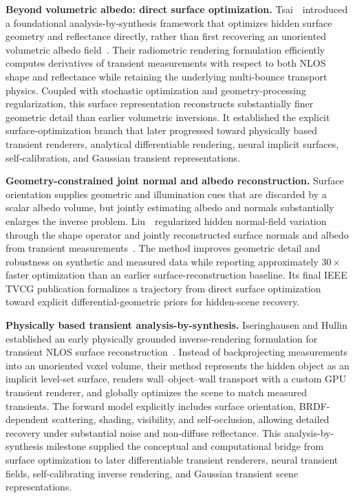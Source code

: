\vspace{0.8mm}
\noindent \textbf{Beyond volumetric albedo: direct surface optimization.}
Tsai~\etal~introduced a foundational analysis-by-synthesis framework that optimizes hidden surface geometry and reflectance directly, rather than first recovering an unoriented volumetric albedo field~\cite{tsaiVolumetricAlbedoSurface2019}. Their radiometric rendering formulation efficiently computes derivatives of transient measurements with respect to both NLOS shape and reflectance while retaining the underlying multi-bounce transport physics. Coupled with stochastic optimization and geometry-processing regularization, this surface representation reconstructs substantially finer geometric detail than earlier volumetric inversions. It established the explicit surface-optimization branch that later progressed toward physically based transient renderers, analytical differentiable rendering, neural implicit surfaces, self-calibration, and Gaussian transient representations.

\vspace{0.8mm}
\noindent \textbf{Geometry-constrained joint normal and albedo reconstruction.}
Surface orientation supplies geometric and illumination cues that are discarded by a scalar albedo volume, but jointly estimating albedo and normals substantially enlarges the inverse problem. Liu~\etal~regularized hidden normal-field variation through the shape operator and jointly reconstructed surface normals and albedo from transient measurements~\cite{liuGeometricConstrainedNLOS2025}. The method improves geometric detail and robustness on synthetic and measured data while reporting approximately $30\times$ faster optimization than an earlier surface-reconstruction baseline. Its final IEEE TVCG publication formalizes a trajectory from direct surface optimization toward explicit differential-geometric priors for hidden-scene recovery.

\vspace{0.8mm}
\noindent \textbf{Physically based transient analysis-by-synthesis.}
Iseringhausen and Hullin established an early physically grounded inverse-rendering formulation for transient NLOS surface reconstruction~\cite{iseringhausen:2018}. Instead of backprojecting measurements into an unoriented voxel volume, their method represents the hidden object as an implicit level-set surface, renders wall--object--wall transport with a custom GPU transient renderer, and globally optimizes the scene to match measured transients. The forward model explicitly includes surface orientation, BRDF-dependent scattering, shading, visibility, and self-occlusion, allowing detailed recovery under substantial noise and non-diffuse reflectance. This analysis-by-synthesis milestone supplied the conceptual and computational bridge from surface optimization to later differentiable transient renderers, neural transient fields, self-calibrating inverse rendering, and Gaussian transient scene representations.

